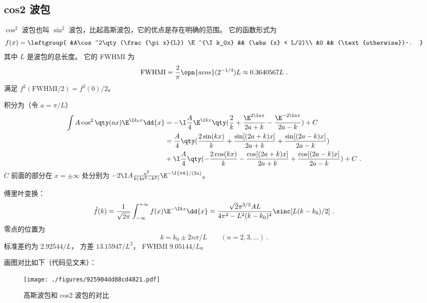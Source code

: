 \subsection{cos2 波包}
$\cos^2$ 波包也叫 $\sin^2$ 波包，比起高斯波包，它的优点是存在明确的范围。 它的函数形式为
\begin{equation}\label{eq_GausPk_5}
f(x) = \leftgroup{
&A\cos^2\qty(\frac{\pi x}{L}) \E^{\I k_0x} && (\abs{x} < L/2)\\
&0 && (\text{otherwise})~.
}\end{equation}
其中 $L$ 是波包的总长度。 它的 FWHMI 为
\begin{equation}\label{eq_GausPk_4} %
\text{FWHMI} = \frac{2}{\pi}\opn{acos}(2^{-1/4}) L \approx 0.3640567 L~.
\end{equation}
满足 $f^2(\text{FWHMI/2}) = f^2(0)/2$。

积分为（令 $a = \pi/L$）
\begin{equation}\label{eq_GausPk_2} %
\begin{aligned}
\int A\cos^2\qty(a x) \E^{\I k_0x} \dd{x} &= -\I\frac{A}{4}\E^{\I kx}\qty(\frac{2}{k} +\frac{\E^{2\I ax}}{2a+k} -\frac{\E^{-2\I ax}}{2a-k}) + C\\
&= \frac{A}{4} \qty(\frac{2\sin(k x)}{k} +\frac{\sin[(2 a+k)x]}{2 a+k} +\frac{\sin[(2 a-k)x]}{2 a-k})\\
&+\I\frac{A}{4} \qty(-\frac{2\cos(k x)}{k} -\frac{\cos[(2 a+k)x]}{2 a+k} +\frac{\cos[(2 a-k)x]}{2 a-k}) + C~.
\end{aligned}
\end{equation}
$C$ 前面的部分在 $x = \pm\infty$ 处分别为 $-2\I A\frac{a^2}{k(4 a^2 -k^2)}\E^{-\I{\pi k}/{(2a)}}$。

傅里叶变换：
\begin{equation} %
\tilde f(k) = \frac{1}{\sqrt{2\pi}} \int_{-\infty}^{+\infty} f(x) \E^{-\I k x} \dd{x}
= \frac{\sqrt{2} \pi ^{3/2} A L}{4 \pi ^2-L^2 (k-k_0)^2} \sinc[L(k-k_0)/2]~.
\end{equation}
零点的位置为
\begin{equation} %
k = k_0 \pm 2n\pi/L \qquad (n=2,3,\dots)~.
\end{equation}
标准差约为 $2.92544/L$， 方差 $13.15947/L^2$， FWHMI $9.05144/L$。

画图对比如下（代码见文末）：
\begin{figure}[ht]
\centering
\texttt{[image: ./figures/925904dd88cd4821.pdf]}
\caption{高斯波包和 cos2 波包的对比} \label{fig_GausPk_2}
\end{figure}

